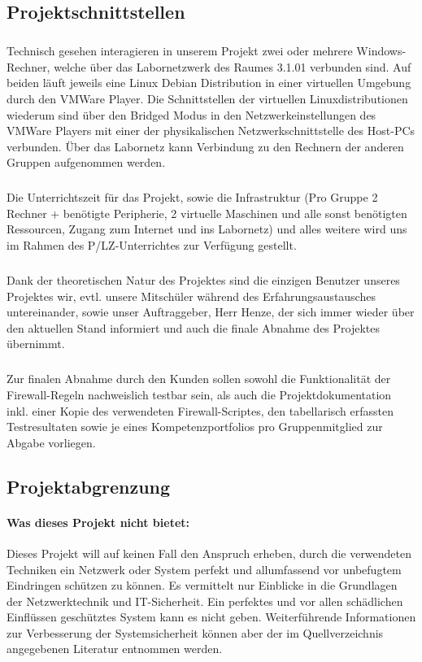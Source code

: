 \subsection{Projektschnittstellen} 
\label{sec:Projektschnittstellen}
\subparagraph{} Technisch gesehen interagieren in unserem Projekt zwei oder mehrere Windows-Rechner, welche über das Labornetzwerk des Raumes 3.1.01 verbunden sind. Auf beiden läuft jeweils eine Linux Debian Distribution in einer virtuellen Umgebung durch den VMWare Player. Die Schnittstellen der virtuellen Linuxdistributionen wiederum sind über den Bridged Modus in den Netzwerkeinstellungen des VMWare Players mit einer der physikalischen Netzwerkschnittstelle des Host-PCs verbunden. Über das Labornetz kann Verbindung zu den Rechnern der anderen Gruppen aufgenommen werden.
\subparagraph{} Die Unterrichtszeit für das Projekt, sowie die Infrastruktur (Pro Gruppe 2 Rechner + benötigte Peripherie, 2 virtuelle Maschinen und alle sonst benötigten Ressourcen, Zugang zum Internet und ins Labornetz) und alles weitere wird uns im Rahmen des P/LZ-Unterrichtes zur Verfügung gestellt.
\subparagraph{} Dank der theoretischen Natur des Projektes sind die einzigen Benutzer unseres Projektes wir, evtl. unsere Mitschüler während des Erfahrungsaustausches untereinander, sowie unser Auftraggeber, Herr Henze, der sich immer wieder über den aktuellen Stand informiert und auch die finale Abnahme des Projektes übernimmt. 
\subparagraph{} Zur finalen Abnahme durch den Kunden sollen sowohl die Funktionalität der Firewall-Regeln nachweislich testbar sein, als auch die Projektdokumentation inkl. einer Kopie des verwendeten Firewall-Scriptes, den tabellarisch erfassten Testresultaten sowie je eines Kompetenzportfolios pro Gruppenmitglied zur Abgabe vorliegen.

\subsection{Projektabgrenzung} 
\label{sec:Projektabgrenzung}

\paragraph*{Was dieses Projekt nicht bietet: } Dieses Projekt will auf keinen Fall den Anspruch erheben, durch die verwendeten Techniken ein Netzwerk oder System perfekt und allumfassend vor unbefugtem Eindringen schützen zu können. Es vermittelt nur Einblicke in die Grundlagen der Netzwerktechnik und IT-Sicherheit. Ein perfektes und vor allen schädlichen Einflüssen geschütztes System kann es nicht geben. Weiterführende Informationen zur Verbesserung der Systemsicherheit können aber der im Quellverzeichnis angegebenen Literatur entnommen werden.